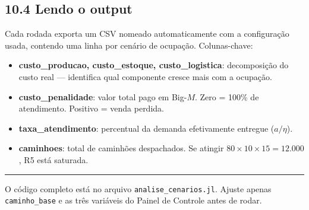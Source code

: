 \documentclass[12pt, a4paper]{article}
\begin{document}
\subsection*{10.4 Lendo o output}

Cada rodada exporta um CSV nomeado automaticamente com a configura\c{c}\~{a}o usada,
contendo uma linha por cen\'{a}rio de ocupa\c{c}\~{a}o. Colunas-chave:

\begin{itemize}[leftmargin=1.5em, itemsep=3pt]
  \item \textbf{custo\_producao, custo\_estoque, custo\_logistica}: decomposi\c{c}\~{a}o do custo real
    --- identifica qual componente cresce mais com a ocupa\c{c}\~{a}o.
  \item \textbf{custo\_penalidade}: valor total pago em Big-$M$.
    Zero = 100\% de atendimento. Positivo = venda perdida.
  \item \textbf{taxa\_atendimento}: percentual da demanda efetivamente entregue ($a / \eta$).
  \item \textbf{caminhoes}: total de caminh\~{o}es despachados. Se atingir
    $80 \times 10 \times 15 = 12.000$, R5 est\'{a} saturada.
\end{itemize}

{\color{accentgray}\rule{\linewidth}{0.5pt}}
\begin{center}
  \small\color{darkgray}
  O c\'{o}digo completo est\'{a} no arquivo \texttt{analise\_cenarios.jl}.
  Ajuste apenas \texttt{caminho\_base} e as tr\^{e}s vari\'{a}veis do Painel de Controle antes de rodar.
\end{center}
\end{document}

